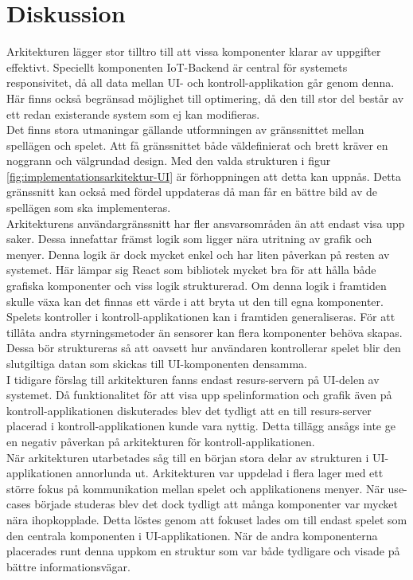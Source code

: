 \section{Diskussion}
Arkitekturen lägger stor tilltro till att vissa komponenter klarar av uppgifter effektivt. Speciellt komponenten IoT-Backend är central för systemets responsivitet, då all data mellan UI- och kontroll-applikation går genom denna. Här finns också begränsad möjlighet till optimering, då den till stor del består av ett redan existerande system som ej kan modifieras.\\

Det finns stora utmaningar gällande utformningen av gränssnittet mellan spellägen och spelet. Att få gränssnittet både väldefinierat och brett kräver en noggrann och välgrundad design. Med den valda strukturen i figur \ref{fig:implementationsarkitektur-UI} är förhoppningen att detta kan uppnås. Detta gränssnitt kan också med fördel uppdateras då man får en bättre bild av de spellägen som ska implementeras.\\

Arkitekturens användargränssnitt har fler ansvarsområden än att endast visa upp saker. Dessa innefattar främst logik som ligger nära utritning av grafik och menyer. Denna logik är dock mycket enkel och har liten påverkan på resten av systemet. Här lämpar sig React som bibliotek mycket bra för att hålla både grafiska komponenter och viss logik strukturerad. Om denna logik i framtiden skulle växa kan det finnas ett värde i att bryta ut den till egna komponenter.\\

Spelets kontroller i kontroll-applikationen kan i framtiden generaliseras. För att tillåta andra styrningsmetoder än sensorer kan flera komponenter behöva skapas. Dessa bör struktureras så att oavsett hur användaren kontrollerar spelet blir den slutgiltiga datan som skickas till UI-komponenten densamma.\\

I tidigare förslag till arkitekturen fanns endast resurs-servern på UI-delen av systemet. Då funktionalitet för att visa upp spelinformation och grafik även på kontroll-applikationen diskuterades blev det tydligt att en till resurs-server placerad i kontroll-applikationen kunde vara nyttig. Detta tillägg ansågs inte ge en negativ påverkan på arkitekturen för kontroll-applikationen.\\

När arkitekturen utarbetades såg till en början stora delar av strukturen i UI-applikationen annorlunda ut. Arkitekturen var uppdelad i flera lager med ett större fokus på kommunikation mellan spelet och applikationens menyer. När use-cases började studeras blev det dock tydligt att många komponenter var mycket nära ihopkopplade. Detta löstes genom att fokuset lades om till endast spelet som den centrala komponenten i UI-applikationen. När de andra komponenterna placerades runt denna uppkom en struktur som var både tydligare och visade på bättre informationsvägar.\\

